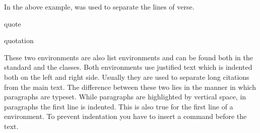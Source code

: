 \begin{Example}
  In the above example,  was used to separate the lines
  of verse.
\end{Example}
\fi %
%
\EndIndexGroup

\begin{Declaration}
  \begin{Environment}{quote}\end{Environment}
  \begin{Environment}{quotation}\end{Environment}
\end{Declaration}%
These two environments are also list environments and can be found
both in the standard and the {\KOMAScript} classes. Both environments
use justified text which is indented both on the left and right side.
Usually they are used to separate long citations from
the main text. The difference between these two lies in the manner in
which paragraphs are typeset. While  paragraphs are
highlighted by vertical space, in  paragraphs
the first line is indented. This is also true for the first line of a
 environment. To prevent indentation you have
to insert a  command before the
text.
\ifCommonmaincls
